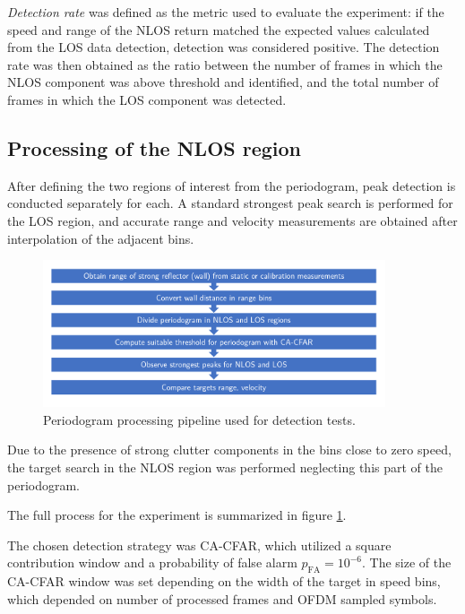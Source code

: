 \textit{Detection rate} was defined as the metric used to evaluate the experiment: if the speed and range of the NLOS return matched the expected values calculated from the LOS data detection, detection was considered positive.
The detection rate was then obtained as the ratio between the number of frames in which the NLOS component was above threshold and identified, and the total number of frames in which the LOS component was detected.

\subsection{Processing of the NLOS region}

After defining the two regions of interest from the periodogram, peak detection is conducted separately for each. A standard strongest peak search is performed for the LOS region, and accurate range and velocity measurements are obtained after interpolation of the adjacent bins.

\begin{figure}[H]
	\centering
	\includegraphics[width=0.9\textwidth]{Images/Test1/NLOS-proc-pipeline.png}
	\caption{Periodogram processing pipeline used for detection tests.}
	\label{fig:Test1_NLOS-proc-pipeline}
\end{figure}


Due to the presence of strong clutter components in the bins close to zero speed, the target search in the NLOS region was performed neglecting this part of the periodogram.

The full process for the experiment is summarized in figure \ref{fig:Test1_NLOS-proc-pipeline}.

The chosen detection strategy was CA-CFAR, which utilized a square contribution window and a probability of false alarm $p_{\text{FA}} = 10^{-6}$. The size of the CA-CFAR window was set depending on the width of the target in speed bins, which depended on number of processed frames and OFDM sampled symbols.

